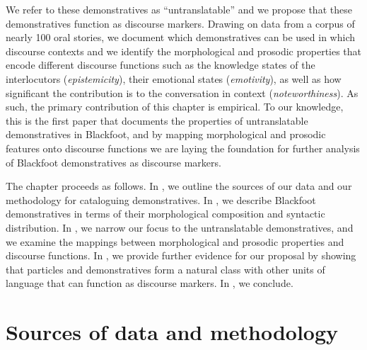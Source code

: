 \documentclass[output=paper,colorlinks,citecolor=brown]{langscibook}
\begin{document}
We refer to these demonstratives as “untranslatable” and we propose that these demonstratives function as discourse markers. Drawing on data from a corpus of nearly 100 oral stories, we document which demonstratives can be used in which discourse contexts and we identify the morphological and prosodic properties that encode different discourse functions such as the knowledge states of the interlocutors (\textit{epistemicity}), their emotional states (\textit{emotivity}), as well as how significant the contribution is to the conversation in context (\textit{noteworthiness}). As such, the primary contribution of this chapter is empirical. To our knowledge, this is the first paper that documents the properties of untranslatable demonstratives in Blackfoot, and by mapping morphological and prosodic features onto discourse functions we are laying the foundation for further analysis of Blackfoot demonstratives as discourse markers.

The chapter proceeds as follows. In , we outline the sources of our data and our methodology for cataloguing demonstratives. In , we describe Blackfoot demonstratives in terms of their morphological composition and syntactic distribution. In , we narrow our focus to the untranslatable demonstratives, and we examine the mappings between morphological and prosodic properties and discourse functions. In , we provide further evidence for our proposal by showing that particles and demonstratives form a natural class with other units of language that can function as discourse markers. In , we conclude.


\section{Sources of data and methodology}\label{sec:bliss:2}
\end{document}
